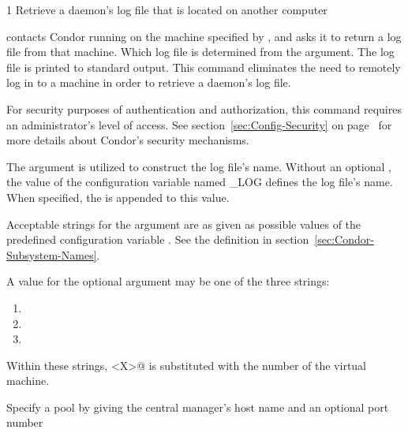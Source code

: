 \begin{ManPage}{\label{man-condor-fetchlog}}{1}
{Retrieve a daemon's log file that is located on another computer}

\Synopsis 
{}
\ToolArgsBase



\Description 

 contacts Condor running on the machine specified by
, and asks it to return a log file from that
machine.  Which log file is determined from
the  argument.
The log file is printed to standard output.
This command eliminates the need to remotely log in to a
machine in order to retrieve a daemon's log file.

For security purposes of authentication and authorization, 
this command requires an administrator's level of access.
See section~\ref{sec:Config-Security} 
on page~\pageref{sec:Config-Security} for more details about Condor's
security mechanisms.

The  argument is utilized to construct
the log file's name.
Without an optional ,
the value of the configuration variable named \_LOG 
defines the log file's name.
When specified, the  is appended to this value.

Acceptable strings for the argument  are as given as
possible values of the predefined configuration
variable .
See the definition in
section~\ref{sec:Condor-Subsystem-Names}.

A value for the optional  argument may be one of
the three strings:
\begin{enumerate}
\item{}
\item{}
\item{}
\end{enumerate}
Within these strings, \verb@<X>@ is substituted with the number of the virtual
machine.
 
\begin{Options}
    \ToolArgsBaseDesc
    {Specify a pool by giving the central manager's host name
    and an optional port number}
\end{Options}


\end{ManPage}
